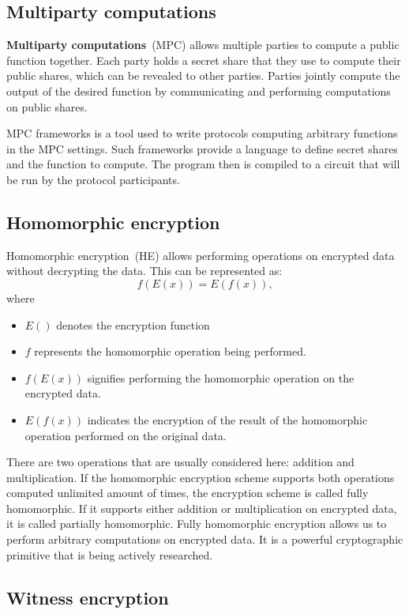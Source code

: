 \documentclass[
    9pt,            %
    report,        %
    affiltop,       %
]{art}
\begin{document}
\subsection{Multiparty computations}\label{MPC}

\textbf{Multiparty computations}~(MPC) allows multiple parties to compute a public function together. Each party holds a secret share that they use to compute their public shares, which can be revealed to other parties. Parties jointly compute the output of the desired function by communicating and performing computations on public shares.

MPC frameworks is a tool used to write protocols computing arbitrary functions in the MPC settings. Such frameworks provide a language to define secret shares and the function to compute. The program then is compiled to a circuit that will be run by the protocol participants.

\subsection{Homomorphic encryption}\label{HE}

Homomorphic encryption~(HE) allows performing operations on encrypted data without decrypting the data. This can be represented as: 
$$f(E(x)) = E(f(x)),$$ 
where
\begin{itemize}
\item $E()$ denotes the encryption function
\item $f$ represents the homomorphic operation being performed.
\item $f(E(x))$ signifies performing the homomorphic operation on the encrypted data.
\item $E(f(x))$ indicates the encryption of the result of the homomorphic operation performed on the original data.
\end{itemize}

There are two operations that are usually considered here: addition and multiplication. If the homomorphic encryption scheme supports both operations computed unlimited amount of times, the encryption scheme is called fully homomorphic. If it supports either addition or multiplication on encrypted data, it is called partially homomorphic. Fully homomorphic encryption allows us to perform arbitrary computations on encrypted data. It is a powerful cryptographic primitive that is being actively researched.

\subsection{Witness encryption}\label{WE}
\end{document}
